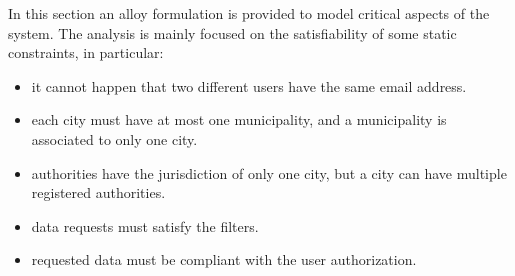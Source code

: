 In this section an alloy formulation is provided to model critical aspects of the system. The analysis is mainly focused on the satisfiability of some static constraints, in particular:
\begin{itemize}
	\item it cannot happen that two different users have the same email address.
	\item each city must have at most one municipality, and a municipality is associated to only one city.
	\item authorities have the jurisdiction of only one city, but a city can have multiple registered authorities.
	\item data requests must satisfy the filters.
	\item requested data must be compliant with the user authorization.
\end{itemize}

\vspace{10mm}

